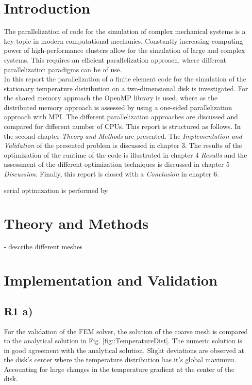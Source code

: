 \documentclass[a4paper, 11pt, oneside]{scrartcl}
\newcommand{\refFig}[1]{Fig. \ref{#1}}
\begin{document}



\mabstract{\blindtext}

\section{Introduction}

The parallelization of code for the simulation of complex mechanical systems is a key-topic in modern computational mechanics. Constantly increasing computing power of high-performance clusters allow for the simulation of large and complex systems. This requires an efficient parallelization approach, where different parallelization paradigms can be of use. \\

In this report the parallelization of a finite element code for the simulation of the stationary temperature distribution on a two-dimensional disk is investigated. For the shared memory approach the OpenMP library is used, where as the distributed memory approach is assessed by using a one-sided parallelization approach with MPI. The different parallelization approaches are discussed and compared for different number of CPUs. This report is structured as follows. In the second chapter \textit{Theory and Methods} are presented. The \textit{Implementation and Validation} of the presented problem is discussed in chapter 3. The results of the optimization of the runtime of the code is illustrated in chapter 4 \textit{Results} and the assessment of the different optimization techniques is discussed in chapter 5 \textit{Discussion}. Finally, this report is closed with a \textit{Conclusion} in chapter 6.

serial optimization is performed by  

\section{Theory and Methods}


- describe different meshes

\section{Implementation and Validation}

\subsection{R1 a)}
For the validation of the FEM solver, the solution of the coarse mesh is compared to the analytical solution in \refFig{fig::TemperatureDist}. The numeric solution is in good agreement with the analytical solution. Slight deviations are observed at the disk's center where the temperature distribution has it's global maximum. Accounting for large changes in the temperature gradient at the center of the disk. 
\end{document}
